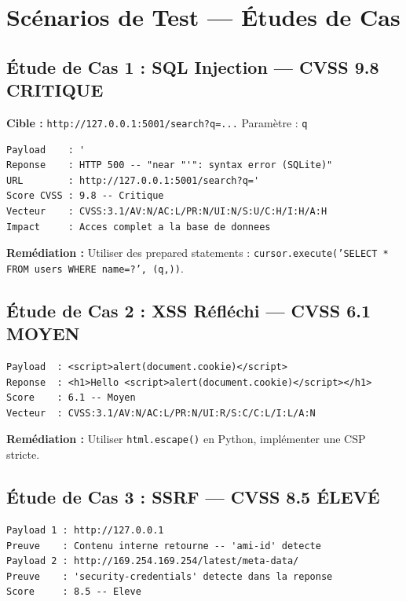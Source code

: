 \documentclass[12pt,a4paper]{report}
\newcommand{\code}[1]{\texttt{#1}}
\begin{document}
\section{Scénarios de Test — Études de Cas}

\subsection{Étude de Cas 1 : SQL Injection — CVSS 9.8 CRITIQUE}

\begin{critbox}
  \textbf{Cible :} \code{http://127.0.0.1:5001/search?q=...} \quad Paramètre : \code{q}
\end{critbox}

\begin{lstlisting}[style=bash, caption={Résultat — SQL Injection}]
Payload    : '
Reponse    : HTTP 500 -- "near "'": syntax error (SQLite)"
URL        : http://127.0.0.1:5001/search?q='
Score CVSS : 9.8 -- Critique
Vecteur    : CVSS:3.1/AV:N/AC:L/PR:N/UI:N/S:U/C:H/I:H/A:H
Impact     : Acces complet a la base de donnees
\end{lstlisting}

\textbf{Remédiation :} Utiliser des prepared statements :
\code{cursor.execute('SELECT * FROM users WHERE name=?', (q,))}.

\subsection{Étude de Cas 2 : XSS Réfléchi — CVSS 6.1 MOYEN}

\begin{lstlisting}[style=bash, caption={Résultat — XSS Réfléchi}]
Payload  : <script>alert(document.cookie)</script>
Reponse  : <h1>Hello <script>alert(document.cookie)</script></h1>
Score    : 6.1 -- Moyen
Vecteur  : CVSS:3.1/AV:N/AC:L/PR:N/UI:R/S:C/C:L/I:L/A:N
\end{lstlisting}

\textbf{Remédiation :} Utiliser \code{html.escape()} en Python, implémenter une CSP stricte.

\subsection{Étude de Cas 3 : SSRF — CVSS 8.5 ÉLEVÉ}

\begin{lstlisting}[style=bash, caption={Résultat — SSRF}]
Payload 1 : http://127.0.0.1
Preuve    : Contenu interne retourne -- 'ami-id' detecte
Payload 2 : http://169.254.169.254/latest/meta-data/
Preuve    : 'security-credentials' detecte dans la reponse
Score     : 8.5 -- Eleve
\end{lstlisting}
\end{document}
